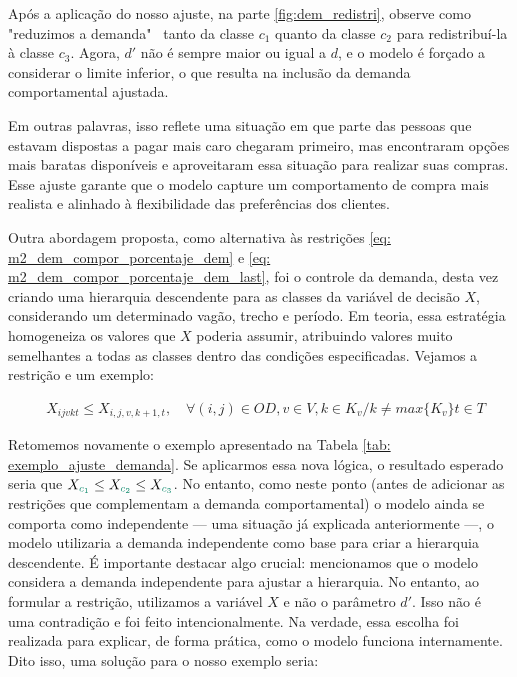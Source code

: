 Após a aplicação do nosso ajuste, na parte \ref{fig:dem_redistri}, observe como "reduzimos a demanda" \, tanto da classe $c_1$ quanto da classe $c_2$ para redistribuí-la à classe $c_3$. Agora, $d'$ não é sempre maior ou igual a $d$, e o modelo é forçado a considerar o limite inferior, o que resulta na inclusão da demanda comportamental ajustada.

Em outras palavras, isso reflete uma situação em que parte das pessoas que estavam dispostas a pagar mais caro chegaram primeiro, mas encontraram opções mais baratas disponíveis e aproveitaram essa situação para realizar suas compras. Esse ajuste garante que o modelo capture um comportamento de compra mais realista e alinhado à flexibilidade das preferências dos clientes.

Outra abordagem proposta, como alternativa às restrições \ref{eq: m2_dem_compor_porcentaje_dem} e \ref{eq: m2_dem_compor_porcentaje_dem_last}, foi o controle da demanda, desta vez criando uma hierarquia descendente para as classes da variável de decisão $X$, considerando um determinado vagão, trecho e período. Em teoria, essa estratégia homogeneiza os valores que $X$ poderia assumir, atribuindo valores muito semelhantes a todas as classes dentro das condições especificadas. Vejamos a restrição e um exemplo:

\allowdisplaybreaks
\begin{align}
	&X_{ijvkt} \leq X_{i,j,v,k+1,t}, \quad   \forall(i,j) \in OD, v \in V, k \in K_v / k \neq max\{K_v\}t \in T  \label{eq: m2_ajuste_hierarquia}
\end{align}

Retomemos novamente o exemplo apresentado na Tabela \ref{tab: exemplo_ajuste_demanda}. Se aplicarmos essa nova lógica, o resultado esperado seria que $X_{\textcolor[rgb]{0.0588, 0.5412, 0.4275}{c_1}} \leq X_{\textcolor[rgb]{0.0588, 0.5412, 0.4275}{c_2}} \leq X_{\textcolor[rgb]{0.0588, 0.5412, 0.4275}{c_3}}$. No entanto, como neste ponto (antes de adicionar as restrições que complementam a demanda comportamental) o modelo ainda se comporta como independente — uma situação já explicada anteriormente —, o modelo utilizaria a demanda independente como base para criar a hierarquia descendente. É importante destacar algo crucial: mencionamos que o modelo considera a demanda independente para ajustar a hierarquia. No entanto, ao formular a restrição, utilizamos a variável $X$ e não o parâmetro $d'$. Isso não é uma contradição e foi feito intencionalmente. Na verdade, essa escolha foi realizada para explicar, de forma prática, como o modelo funciona internamente. Dito isso, uma solução para o nosso exemplo seria:

